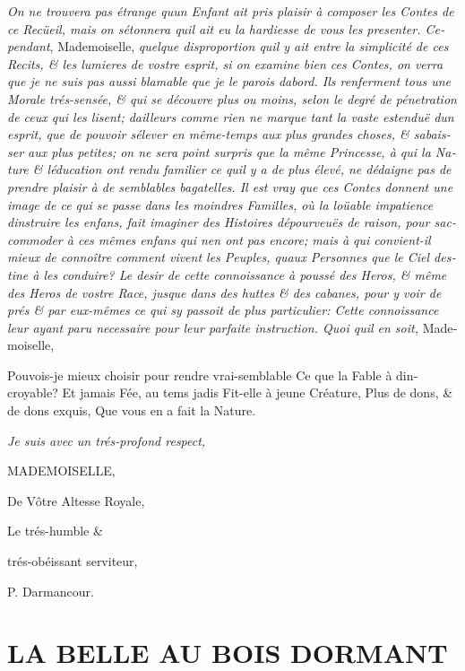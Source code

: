 \documentclass[14pt,a4paper]{memoir}
\begin{document}
\begin{otherlanguage}{french}
\emph{On ne trouvera pas étrange qu\textquotesingle un Enfant ait pris
plaisir à composer les Contes de ce Recüeil, mais on
s\textquotesingle étonnera qu\textquotesingle il ait eu la hardiesse de
vous les presenter. Cependant}, {Mademoiselle}, \emph{quelque
disproportion qu\textquotesingle il y ait entre la simplicité de ces
Recits, \& les lumieres de vostre esprit, si on examine bien ces Contes,
on verra que je ne suis pas aussi blamable que je le parois
d\textquotesingle abord. Ils renferment tous une Morale trés-sensée, \&
qui se découvre plus ou moins, selon le degré de pénetration de ceux qui
les lisent; d\textquotesingle ailleurs comme rien ne marque tant la
vaste estenduë d\textquotesingle un esprit, que de pouvoir
s\textquotesingle élever en même-temps aux plus grandes choses, \&
s\textquotesingle abaisser aux plus petites; on ne sera point surpris
que la même Princesse, à qui la Nature \& l\textquotesingle éducation
ont rendu familier ce qu\textquotesingle il y a de plus élevé, ne
dédaigne pas de prendre plaisir à de semblables bagatelles. Il est vray
que ces Contes donnent une image de ce qui se passe dans les moindres
Familles, où la loüable impatience d\textquotesingle instruire les
enfans, fait imaginer des Histoires dépourveuës de raison, pour
s\textquotesingle accommoder à ces mêmes enfans qui n\textquotesingle en
ont pas encore; mais à qui convient-il mieux de connoître comment vivent
les Peuples, qu\textquotesingle aux Personnes que le Ciel destine à les
conduire? Le desir de cette connoissance à poussé des Heros, \& même des
Heros de vostre Race, jusque dans des huttes \& des cabanes, pour y voir
de prés \& par eux-mêmes ce qui s\textquotesingle y passoit de plus
particulier: Cette connoissance leur ayant paru necessaire pour leur
parfaite instruction. Quoi qu\textquotesingle il en soit,}
{Mademoiselle},

{Pouvois-je mieux choisir pour rendre vrai-semblable} {Ce que la Fable à
d\textquotesingle incroyable?} {Et jamais Fée, au tems jadis} {Fit-elle
à jeune Créature,} {Plus de dons, \& de dons exquis,} {Que vous en a
fait la Nature.}

\emph{Je suis avec un trés-profond respect,}

{MADEMOISELLE},

De Vôtre Altesse Royale,

Le trés-humble \&

trés-obéissant serviteur,

{P. Darmancour.}

\section{LA BELLE AU BOIS DORMANT}


\end{otherlanguage}
\end{document}

